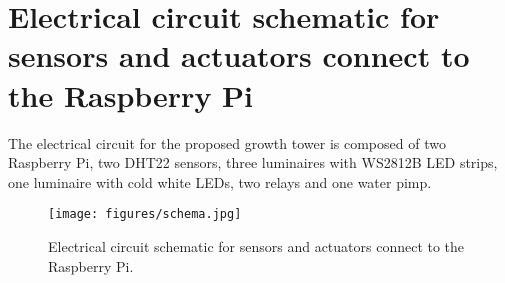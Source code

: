 \documentclass[preprint, review, 12pt]{elsarticle}
\begin{document}
\section{Electrical circuit schematic for sensors and actuators connect to the Raspberry Pi}
\label{ap:eletric}

The electrical circuit for the proposed growth tower is composed of two Raspberry Pi, two DHT22 sensors, three luminaires with WS2812B LED strips, one luminaire with cold white LEDs, two relays and one water pimp. 

\begin{figure}[H]
    \centering
    \texttt{[image: figures/schema.jpg]}
    \caption{Electrical circuit schematic for sensors and actuators connect to the Raspberry Pi.}
    \label{fig:eletric}
\end{figure}

  
 
\end{document}
